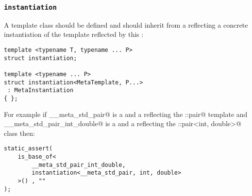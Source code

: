 \subsubsection{\texttt{instantiation}}

A template class \verb@instantiation@ should be defined and should
inherit from a  reflecting a concrete instantiation of
the template reflected by this :

\begin{verbatim}
template <typename T, typename ... P>
struct instantiation;

template <typename ... P>
struct instantiation<MetaTemplate, P...>
 : MetaInstantiation
{ };
\end{verbatim}

For example if \verb@__meta_std_pair@ is a  and a  reflecting
the \verb@std::pair@ template and \verb@__meta_std_pair_int_double@ is a 
and a  reflecting the \verb@std::pair<int, double>@ class then:

\begin{verbatim}
static_assert(
	is_base_of<
		__meta_std_pair_int_double,
		instantiation<__meta_std_pair, int, double>
	>() , ""
);
\end{verbatim}
